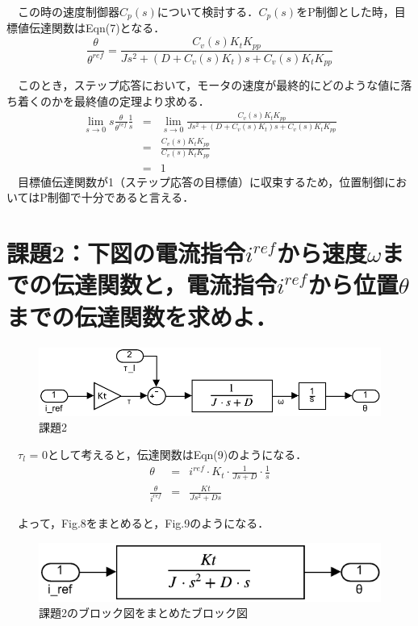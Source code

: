 　この時の速度制御器$C_p(s)$について検討する．$C_p(s)$をP制御とした時，目標値伝達関数はEqn(7)となる．
\begin{equation}
    \frac{\theta}{\theta^{ref}} = \frac{C_v(s) K_t K_{pp}}{Js^2 + \left(D + C_v(s) K_t\right)s + C_v(s) K_t K_{pp}}
\end{equation}

　このとき，ステップ応答において，モータの速度が最終的にどのような値に落ち着くのかを最終値の定理より求める．
\begin{eqnarray}
    \lim_{s \to 0} s \frac{\theta}{\theta^{ref}} \frac{1}{s} &=& \lim_{s \to 0} \frac{C_v(s) K_t K_{pp}}{Js^2 + \left(D + C_v(s) K_t\right)s + C_v(s) K_t K_{pp}} \nonumber \\
    &=& \frac{C_v(s) K_t K_{pp}}{C_v(s) K_t K_{pp}} \nonumber \\
    &=& 1
\end{eqnarray}
　目標値伝達関数が1（ステップ応答の目標値）に収束するため，位置制御においてはP制御で十分であると言える．\\

\section{課題2：下図の電流指令$i^{ref}$から速度$\omega$までの伝達関数と，電流指令$i^{ref}$から位置$\theta$までの伝達関数を求めよ．}
\begin{figure}[H]
    \centering
    \includegraphics[]{./fig/2.pdf}
    \caption{課題2}
\end{figure}

　$\tau_l$ = 0として考えると，伝達関数はEqn(9)のようになる．
\begin{eqnarray}
\theta &=& i^{ref} \cdot K_t \cdot \frac{1}{Js+D} \cdot \frac{1}{s} \nonumber \\
\frac{\theta}{i^{ref}} &=& \frac{Kt}{Js^2 + Ds}
\end{eqnarray}

　よって，Fig.8をまとめると，Fig.9のようになる．
\begin{figure}[H]
    \centering
    \includegraphics[]{./fig/2_ans.pdf}
    \caption{課題2のブロック図をまとめたブロック図}
\end{figure}



